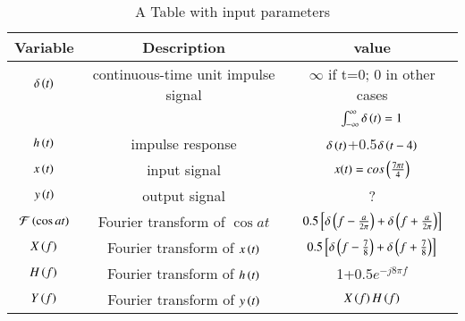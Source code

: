 \begin{table}[ht]
 \centering
  \begin{tabular}{|c|c|c|}
    \hline
    \textbf{Variable} & \textbf{Description} & \textbf{value}\\
    \hline
    $\delta\left(t\right)$ & continuous-time unit impulse signal &$\infty$ if t=0;  0 in other cases \\& &$\int_{-\infty} ^ {\infty} \delta\left(t\right)=1$\\
   \hline
    $h\left(t\right)$ & impulse response & $\delta\left(t\right)$+0.5$ \delta\left(t-4\right)$ \\
    \hline
    $x\left(t\right)$ & input signal  & $x(t)=cos\left(\frac{7\pi t}{4}\right)$ \\
    \hline
        $y\left(t\right)$ & output signal  & ? \\
    \hline
     $\mathcal{F}\left(\cos{a t}\right)$ & Fourier transform of $\cos{a t}$ & $0.5{}\left[\delta \left(f-\frac{a}{2\pi}\right)+\delta \left(f+\frac{a}{2\pi}\right)\right]$\\
    \hline
    $X\left(f\right)$ & Fourier transform of $x\left(t\right)$ & $0.5{}\left[\delta \left(f-\frac{7}{8}\right)+\delta \left(f+\frac{7}{8}\right)\right]$\\
    \hline
        $H\left(f\right)$ & Fourier transform of $h\left(t\right)$ & 1+0.5$e^{-j8\pi f}$\\
    \hline
     $Y\left(f\right)$ & Fourier transform of $y\left(t\right)$ & $X\left(f\right)H\left(f\right)$\\
    \hline
    \end{tabular}
  \caption{A Table with input parameters}
  \label{tab:gate2023in36}
\end{table}

